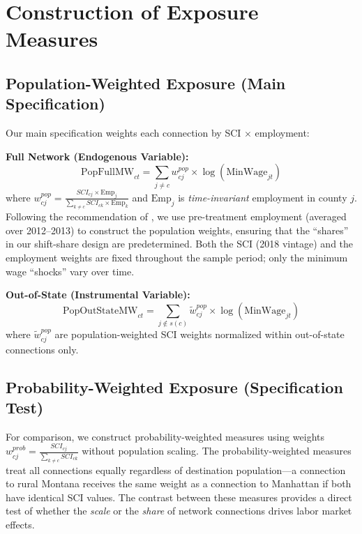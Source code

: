 \documentclass[12pt]{article}
\begin{document}
\section{Construction of Exposure Measures}
\label{sec:construction}

\subsection{Population-Weighted Exposure (Main Specification)}

Our main specification weights each connection by SCI $\times$ employment:

\textbf{Full Network (Endogenous Variable):}
\begin{equation}
\text{PopFullMW}_{ct} = \sum_{j \neq c} w^{pop}_{cj} \times \log(\text{MinWage}_{jt})
\end{equation}
where $w^{pop}_{cj} = \frac{SCI_{cj} \times \text{Emp}_j}{\sum_{k \neq c} SCI_{ck} \times \text{Emp}_k}$ and $\text{Emp}_j$ is \textit{time-invariant} employment in county $j$. Following the recommendation of \citet{borusyak2022quasi}, we use pre-treatment employment (averaged over 2012--2013) to construct the population weights, ensuring that the ``shares'' in our shift-share design are predetermined. Both the SCI (2018 vintage) and the employment weights are fixed throughout the sample period; only the minimum wage ``shocks'' vary over time.

\textbf{Out-of-State (Instrumental Variable):}
\begin{equation}
\text{PopOutStateMW}_{ct} = \sum_{j \notin s(c)} \tilde{w}^{pop}_{cj} \times \log(\text{MinWage}_{jt})
\end{equation}
where $\tilde{w}^{pop}_{cj}$ are population-weighted SCI weights normalized within out-of-state connections only.

\subsection{Probability-Weighted Exposure (Specification Test)}

For comparison, we construct probability-weighted measures using weights $w^{prob}_{cj} = \frac{SCI_{cj}}{\sum_{k \neq c} SCI_{ck}}$ without population scaling. The probability-weighted measures treat all connections equally regardless of destination population---a connection to rural Montana receives the same weight as a connection to Manhattan if both have identical SCI values. The contrast between these measures provides a direct test of whether the \textit{scale} or the \textit{share} of network connections drives labor market effects.
\end{document}
